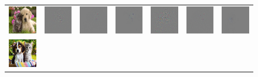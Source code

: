 \setlength{\tabcolsep}{0.5pt}
\begin{figure}
\begin{center}
\begin{tabular}{ccccccc}
\vspace{-2.5pt}
\includegraphics[width=0.14\linewidth,height=0.11\linewidth]{figs/examples/googlenet/oxford/dog-cat1} &
\includegraphics[width=0.14\linewidth,height=0.11\linewidth]{figs/examples/googlenet/oxford/dog-cat1_diff_258} &
\includegraphics[width=0.14\linewidth,height=0.11\linewidth]{figs/examples/googlenet/deconv/dog-cat1_diff_258} &
\includegraphics[width=0.14\linewidth,height=0.11\linewidth]{figs/examples/googlenet/soft/dog-cat1_diff_258} &
\includegraphics[width=0.14\linewidth,height=0.11\linewidth]{figs/examples/googlenet/oxford/dog-cat1_diff_286} &
\includegraphics[width=0.14\linewidth,height=0.11\linewidth]{figs/examples/googlenet/deconv/dog-cat1_diff_286} &
\includegraphics[width=0.14\linewidth,height=0.11\linewidth]{figs/examples/googlenet/soft/dog-cat1_diff_286} \\
\vspace{-2.5pt}
\includegraphics[width=0.14\linewidth,height=0.11\linewidth]{figs/examples/googlenet/oxford/dog-cat2} &

\end{tabular}
\end{center}
\end{figure}
